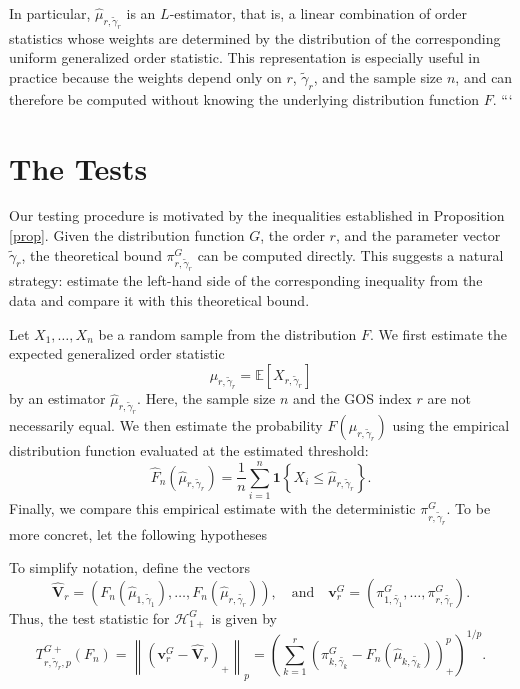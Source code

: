 \documentclass[authoryear,preprint,3p,review,10pt]{elsarticle}
\theoremstyle{definition}
\begin{document}
	In particular, \(\widehat{\mu}_{r,\tilde{\gamma}_r}\) is an
	\(L\)-estimator, that is, a linear combination of order statistics
	whose weights are determined by the distribution of the corresponding
	uniform generalized order statistic. This representation is especially
	useful in practice because the weights depend only on
	\(r\), \(\tilde{\gamma}_r\), and the sample size \(n\), and can
	therefore be computed without knowing the underlying distribution
	function \(F\).
	```
	
	
	
	\section{The Tests}
	Our testing procedure is motivated by the inequalities established in Proposition \ref{prop}. Given the distribution function \(G\), the order \(r\), and the parameter vector \(\tilde{\gamma}_r\), the theoretical bound \(\pi_{r,\tilde{\gamma}_r}^{G}\) can be computed directly. This suggests a natural strategy: estimate the left-hand side of the corresponding inequality from the data and compare it with this theoretical bound.
	
	Let \(X_1,\ldots,X_n\) be a random sample from the distribution \(F\). We first estimate the expected generalized order statistic
	\[
	\mu_{r,\tilde{\gamma}_r}
	=\mathbb{E}\!\left[X_{r,\tilde{\gamma}_r}\right]
	\]
	by an estimator \(\widehat{\mu}_{r,\tilde{\gamma}_r}\). Here, the sample size \(n\) and the GOS index \(r\) are not necessarily equal. We then estimate the probability \(F(\mu_{r,\tilde{\gamma}_r})\) using the empirical distribution function evaluated at the estimated threshold:
	\[
	\widehat F_n\!\left(
	\widehat{\mu}_{r,\tilde{\gamma}_r}
	\right)
	=
	\frac{1}{n}\sum_{i=1}^{n}
	\mathbf{1}\!\left\{
	X_i\leq\widehat{\mu}_{r,\tilde{\gamma}_r}
	\right\}.
	\]
	Finally, we compare this empirical estimate with the deterministic \(\pi_{r,\tilde{\gamma}_r}^{G}\). To be more concret, let the following hypotheses
	
	
	To simplify notation, define the vectors
	\[
	\hat{\mathbf{V}}_r = \left( F_n(\widehat \mu_{1,\tilde\gamma_1}), \dots, F_n(\widehat{\mu}_{r,\tilde{\gamma_r}}) \right), \quad \text{and} \quad \mathbf{v}_r^G = \left( \pi_{1,\tilde{\gamma_1}}^G, \dots, \pi_{r,\tilde{\gamma_r}}^G \right).
	\]
	Thus, the test statistic for \( \mathcal{H}_{1+}^G \) is given by
	\[
	T_{r,\tilde \gamma_r,p}^{G+}(F_n) = \left\| \left( \mathbf{v}_r^G - \hat{\mathbf{V}}_r \right)_+ \right\|_p = \left( \sum_{k=1}^r \left( \pi_{k,\tilde{\gamma_k}}^G - F_n(\hat{\mu}_{k,\tilde{\gamma_k}}) \right)_+^p \right)^{1/p}.
	\]
	
\end{document}
